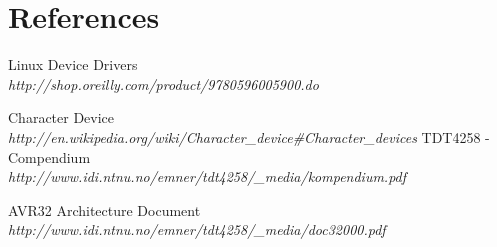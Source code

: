 \section{References}

\begin{enumerate}
	 Linux Device Drivers\\
		\emph{http://shop.oreilly.com/product/9780596005900.do}

	 Character Device
		\emph{http://en.wikipedia.org/wiki/Character\_device#Character\_devices}
	 TDT4258 - Compendium\\
		\emph{http://www.idi.ntnu.no/emner/tdt4258/\_media/kompendium.pdf}

	 AVR32 Architecture Document\\
		\emph{http://www.idi.ntnu.no/emner/tdt4258/\_media/doc32000.pdf}

\end{enumerate}

